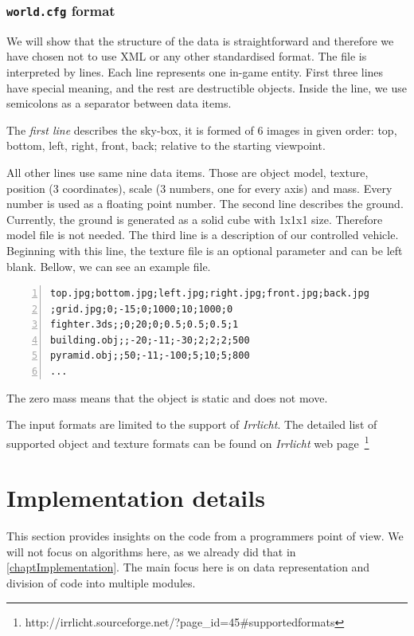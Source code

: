 \subsubsection{{\tt world.cfg} format}
We will show that the structure of the data is straightforward and therefore we have chosen not to use XML or any other standardised format. The file is interpreted by lines. Each line represents one in-game entity. First three lines have special meaning, and the rest are destructible objects. Inside the line, we use semicolons as a separator between data items.

The \emph{first line} describes the sky-box, it is formed of 6 images in given order: top, bottom, left, right, front, back; relative to the starting viewpoint. 

All other lines use same nine data items. Those are object model, texture, position (3 coordinates), scale (3 numbers, one for every axis) and mass. Every number is used as a floating point number.
The second line describes the ground. Currently, the ground is generated as a solid cube with 1x1x1 size. Therefore model file is not needed. The third line is a description of our controlled vehicle. Beginning with this line, the texture file is an optional parameter and can be left blank. Bellow, we can see an example file.

\begin{centering}
\begin{Verbatim}[frame=single,numbers=left,xleftmargin=5mm]
top.jpg;bottom.jpg;left.jpg;right.jpg;front.jpg;back.jpg
;grid.jpg;0;-15;0;1000;10;1000;0
fighter.3ds;;0;20;0;0.5;0.5;0.5;1
building.obj;;-20;-11;-30;2;2;2;500
pyramid.obj;;50;-11;-100;5;10;5;800
...
\end{Verbatim}
\end{centering}
The zero mass means that the object is static and does not move.

The input formats are limited to the support of \emph{Irrlicht}. The detailed list of supported object and texture formats can be found on \emph{Irrlicht} web page~\footnote{http://irrlicht.sourceforge.net/?page\_id=45\#supportedformats}



\section{Implementation details}
This section provides insights on the code from a programmers point of view. We will not focus on algorithms here, as we already did that in \cref{chaptImplementation}. The main focus here is on data representation and division of code into multiple modules.

